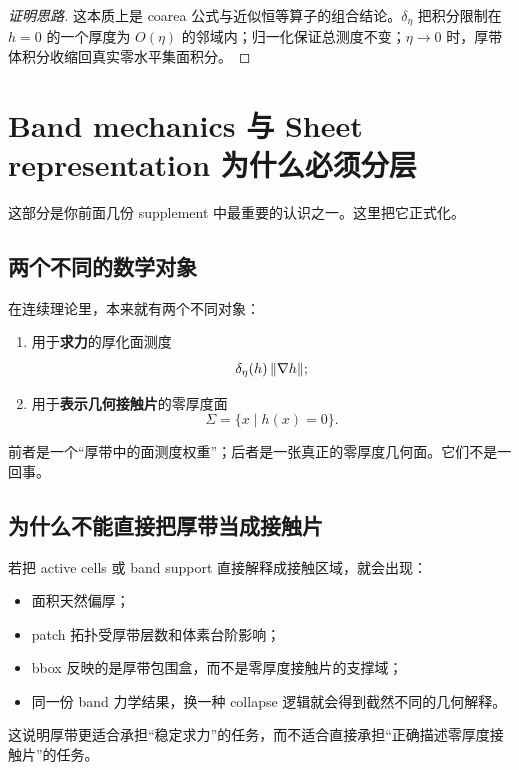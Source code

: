 \documentclass[12pt,a4paper]{ctexart}
\begin{document}
\begin{proof}[证明思路]
这本质上是 coarea 公式与近似恒等算子的组合结论。$\delta_\eta$ 把积分限制在 $h=0$ 的一个厚度为 $O(\eta)$ 的邻域内；归一化保证总测度不变；$\eta\to 0$ 时，厚带体积分收缩回真实零水平集面积分。
\end{proof}

\section{Band mechanics 与 Sheet representation 为什么必须分层}

这部分是你前面几份 supplement 中最重要的认识之一。这里把它正式化。

\subsection{两个不同的数学对象}
在连续理论里，本来就有两个不同对象：
\begin{enumerate}
    \item 用于\textbf{求力}的厚化面测度
    \begin{equation}
        \delta_\eta(h)\,\norm{\nabla h};
    \end{equation}
    \item 用于\textbf{表示几何接触片}的零厚度面
    \begin{equation}
        \Sigma=\{x\mid h(x)=0\}.
    \end{equation}
\end{enumerate}

前者是一个“厚带中的面测度权重”；后者是一张真正的零厚度几何面。它们不是一回事。

\subsection{为什么不能直接把厚带当成接触片}
若把 active cells 或 band support 直接解释成接触区域，就会出现：
\begin{itemize}
    \item 面积天然偏厚；
    \item patch 拓扑受厚带层数和体素台阶影响；
    \item bbox 反映的是厚带包围盒，而不是零厚度接触片的支撑域；
    \item 同一份 band 力学结果，换一种 collapse 逻辑就会得到截然不同的几何解释。
\end{itemize}

这说明厚带更适合承担“稳定求力”的任务，而不适合直接承担“正确描述零厚度接触片”的任务。
\end{document}
